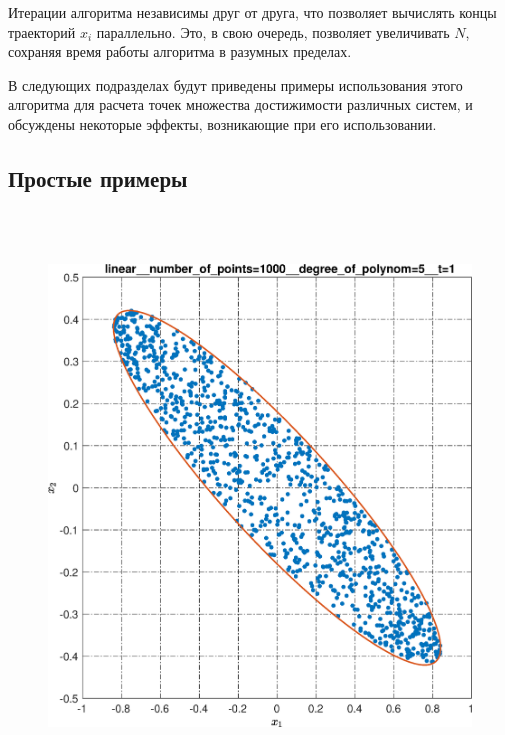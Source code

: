 \documentclass[../main.tex]{subfiles}
\begin{document}
  Итерации алгоритма независимы друг от друга, что позволяет вычислять концы траекторий $x_i$ параллельно. 
  Это, в свою очередь, позволяет увеличивать $N$, сохраняя время работы алгоритма в разумных пределах.
  
  В следующих подразделах будут приведены примеры использования этого алгоритма для расчета точек множества достижимости различных систем, и обсуждены некоторые эффекты, возникающие при его использовании.
  
  \subsection{Простые примеры}
  \begin{figure}[ht!] 
  	\hspace{-2.5ex}
  	\begin{minipage}[b]{.3\linewidth} 
  		\small
  		\centering 
  		\includegraphics[width=\linewidth]{images/linear__number_of_points=1000__degree_of_polynom=5__t=1.eps}
  		\label{fig:ap:linearN103k5T1} 
  	\end{minipage}
  	\hfill
  	\begin{minipage}[b]{.3\linewidth} 
  		\small
  		\centering

\end{minipage}
\end{figure}
\end{document}
